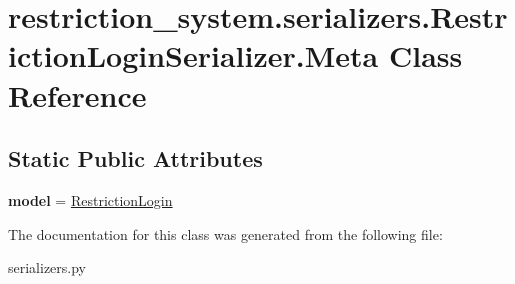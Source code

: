 \hypertarget{classrestriction__system_1_1serializers_1_1RestrictionLoginSerializer_1_1Meta}{}\section{restriction\+\_\+system.\+serializers.\+Restriction\+Login\+Serializer.\+Meta Class Reference}
\label{classrestriction__system_1_1serializers_1_1RestrictionLoginSerializer_1_1Meta}
\subsection*{Static Public Attributes}
\begin{DoxyCompactItemize}
\item 
\hypertarget{classrestriction__system_1_1serializers_1_1RestrictionLoginSerializer_1_1Meta_ac0d37666c9c729f21b08f5cbea8352c9}{}{\bfseries model} = \hyperlink{classrestriction__system_1_1models_1_1RestrictionLogin}{Restriction\+Login}\label{classrestriction__system_1_1serializers_1_1RestrictionLoginSerializer_1_1Meta_ac0d37666c9c729f21b08f5cbea8352c9}

\end{DoxyCompactItemize}


The documentation for this class was generated from the following file\+:\begin{DoxyCompactItemize}
\item 
serializers.\+py\end{DoxyCompactItemize}
